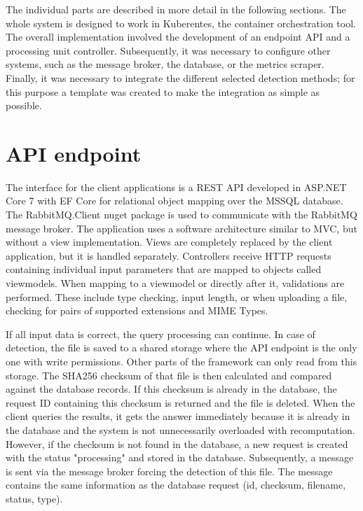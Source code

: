 The individual parts are described in more detail in the following sections. The whole system is designed to work in Kuberentes, the container orchestration tool. The overall implementation involved the development of an endpoint API and a processing unit controller. Subsequently, it was necessary to configure other systems, such as the message broker, the database, or the metrics scraper. Finally, it was necessary to integrate the different selected detection methods; for this purpose a template was created to make the integration as simple as possible.

\section{API endpoint}

The interface for the client applications is a REST API developed in ASP.NET Core 7 with EF Core for relational object mapping over the MSSQL database. The RabbitMQ.Client nuget package is used to communicate with the RabbitMQ message broker. The application uses a software architecture similar to MVC, but without a view implementation.  Views are completely replaced by the client application, but it is handled separately. Controllers receive HTTP requests containing individual input parameters that are mapped to objects called viewmodels. When mapping to a viewmodel or directly after it, validations are performed. These include type checking, input length, or when uploading a file, checking for pairs of supported extensions and MIME Types.

If all input data is correct, the query processing can continue. In case of detection, the file is saved to a shared storage where the API endpoint is the only one with write permissions. Other parts of the framework can only read from this storage. The SHA256 checksum of that file is then calculated and compared against the database records. If this checksum is already in the database, the request ID containing this checksum is returned and the file is deleted. When the client queries the results, it gets the answer immediately because it is already in the database and the system is not unnecessarily overloaded with recomputation. However, if the checksum is not found in the database, a new request is created with the status "processing" and stored in the database. Subsequently, a message is sent via the message broker forcing the detection of this file. The message contains the same information as the database request (id, checksum, filename, status, type).

